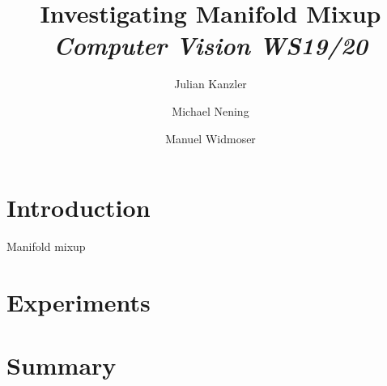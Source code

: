 \documentclass{article}
\title{\vspace*{-3em}\huge \textbf{Investigating Manifold Mixup}\\[0.25em] \large \textit{Computer Vision WS19/20}\\[0.25em]}
\date{}
\author{
	Julian Kanzler \and
	Michael Nening \and
	Manuel Widmoser
}
\begin{document}
\maketitle

\begin{abstract}
	\lipsum[1]
\end{abstract}

\section{Introduction}
Manifold mixup~\cite{verma19}

\section{Experiments}

\section{Summary}

{}

\end{document}
